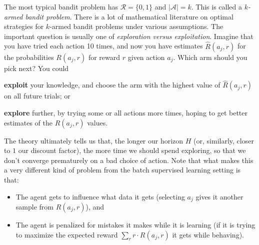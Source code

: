 The most typical bandit problem has $\mathcal R = \{0, 1\}$ and
$\lvert \mathcal A \rvert = k$. 
This is called a {\em $k$-armed bandit problem}.
There is a lot of mathematical literature on optimal strategies for
$k$-armed bandit problems under various assumptions.  The important
question is usually one of {\em exploration versus exploitation}.
Imagine that you have tried each action 10 times, and now you have
estimates $\hat{R}(a_j, r)$ for the probabilities $R(a_j, r)$ for reward $r$ given action $a_j$.  Which arm
should you pick next?  You could
\begin{description}
\item{\bf exploit} your knowledge, and choose the arm with the highest
  value of $\hat{R}(a_j, r)$ on all future trials; or 
\item{\bf explore} further, by trying some or all actions more times,
  hoping to get better estimates of the $R(a_j, r)$ values.
\end{description}
The theory ultimately tells us that, the longer our horizon $H$ (or,
similarly, closer to $1$ our discount factor), the more time we should
spend exploring, so that we don't converge prematurely on a bad choice
of action.
Note that what makes this a very different kind of problem from the
batch supervised learning setting is that:
\begin{itemize}
\item The agent gets to influence what data it gets (selecting $a_j$
  gives it another sample from $R(a_j, r)$), and
\item The agent is penalized for mistakes it makes while it is
  learning (if it is trying to maximize the expected reward $\sum_r r
  \cdot R(a_j, r)$ it
  gets while behaving).
\end{itemize}

